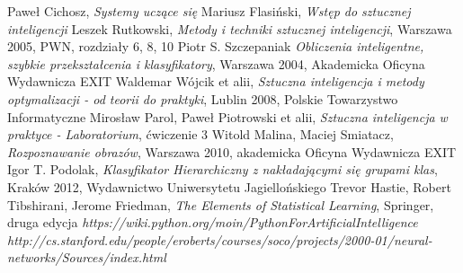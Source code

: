 \documentclass[12pt,a4paper,oneside]{report} %
\begin{document}
\begin{thebibliography}{9}
 Paweł Cichosz, \emph{Systemy uczące się}
 Mariusz Flasiński, \emph{Wstęp do sztucznej inteligencji}
 Leszek Rutkowski, \emph{Metody i techniki sztucznej inteligencji}, Warszawa 2005, PWN, rozdziały 6, 8, 10
 Piotr S. Szczepaniak \emph{Obliczenia inteligentne, szybkie przekształcenia i klasyfikatory}, Warszawa 2004, Akademicka Oficyna Wydawnicza EXIT
 Waldemar Wójcik et alii, \emph{Sztuczna inteligencja i metody optymalizacji - od teorii do praktyki}, Lublin 2008, Polskie Towarzystwo Informatyczne
 Mirosław Parol, Paweł Piotrowski et alii, \emph{Sztuczna inteligencja w praktyce - Laboratorium}, ćwiczenie 3
 Witold Malina, Maciej Smiatacz, \emph{Rozpoznawanie obrazów}, Warszawa 2010, akademicka Oficyna Wydawnicza EXIT
 Igor T. Podolak, \emph{Klasyfikator Hierarchiczny z nakładającymi się grupami klas}, Kraków 2012, Wydawnictwo Uniwersytetu Jagiellońskiego
 Trevor Hastie, Robert Tibshirani, Jerome Friedman, \emph{The Elements of Statistical Learning}, Springer, druga edycja
 \emph{https://wiki.python.org/moin/PythonForArtificialIntelligence}
 \emph{http://cs.stanford.edu/people/eroberts/courses/soco/projects/2000-01/neural-networks/Sources/index.html}
\end{thebibliography}
\end{document}
